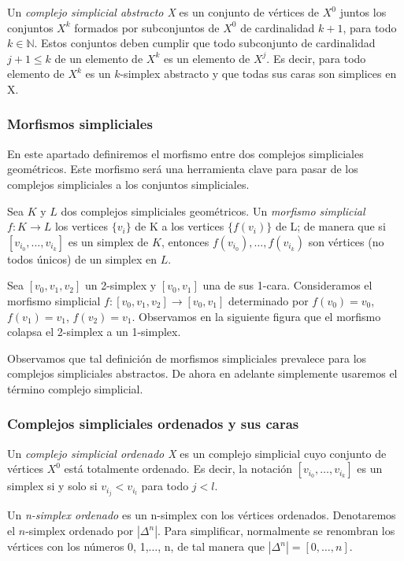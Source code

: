 \documentclass[../main.tex]{subfiles}
\begin{document}
\begin{defi}
    Un \emph{complejo simplicial abstracto X} es un conjunto de v\'ertices de $X^0$ juntos los conjuntos $X^k$ formados por subconjuntos de $X^0$ de cardinalidad $k+1$, para todo $k\in\mathbb{N}$.
    Estos conjuntos deben cumplir que todo subconjunto de cardinalidad $j+1\le k$ de un elemento de $X^k$ es un elemento de $X^j$. Es decir, para todo elemento de $X^k$ es un $k$-simplex abstracto y que todas sus caras son simplices en X.
\end{defi}




\subsubsection{Morfismos simpliciales}
En este apartado definiremos el morfismo entre dos complejos simpliciales geom\'etricos. Este morfismo ser\'a una herramienta clave para pasar de los complejos simpliciales a los conjuntos simpliciales.
\begin{defi}
    Sea $K$ y $L$ dos complejos simpliciales geom\'etricos. Un \emph{morfismo simplicial} $f\colon K \to L$ los vertices $\{v_i\}$ de K a los vertices $\{f(v_i)\}$ de L; de manera que si $[v_{i_0},\dots,v_{i_k}]$ es un simplex de $K$, entonces $f(v_{i_0}),\dots,f(v_{i_k})$ son v\'ertices (no todos \'unicos) de un simplex en $L$.
\end{defi}
\begin{ex}
    Sea $[v_0,v_1,v_2]$ un 2-simplex y $[v_0,v_1]$ una de sus 1-cara. Consideramos el morfismo simplicial $f\colon[v_0,v_1,v_2]\to[v_0,v_1]$ determinado por $f(v_0)=v_0$, $f(v_1)=v_1$, $f(v_2)=v_1$. Observamos en la siguiente figura que el morfismo colapsa el 2-simplex a un 1-simplex.
\end{ex}

Observamos que tal definici\'on de morfismos simpliciales prevalece para los complejos simpliciales abstractos. De ahora en adelante simplemente usaremos el t\'ermino complejo simplicial.

\subsubsection{Complejos simpliciales ordenados y sus caras}
\begin{defi}
    Un \emph{complejo simplicial ordenado X} es un complejo simplicial cuyo conjunto de v\'ertices $X^0$ est\'a totalmente ordenado. Es decir, la notaci\'on $[v_{i_0},\dots,v_{i_k}]$ es un simplex si y solo si $v_{i_j} < v_{i_l}$ para todo $j<l$.
\end{defi}
\begin{defi}
    Un \emph{n-simplex ordenado} es un n-simplex con los v\'ertices ordenados. Denotaremos el $n$-simplex ordenado por $|\Delta^n|$. Para simplificar, normalmente se renombran los v\'ertices con los n\'umeros 0, 1,$\dots$, n, de tal manera que $|\Delta^n|=[0,\dots,n]$.
\end{defi}
\end{document}
